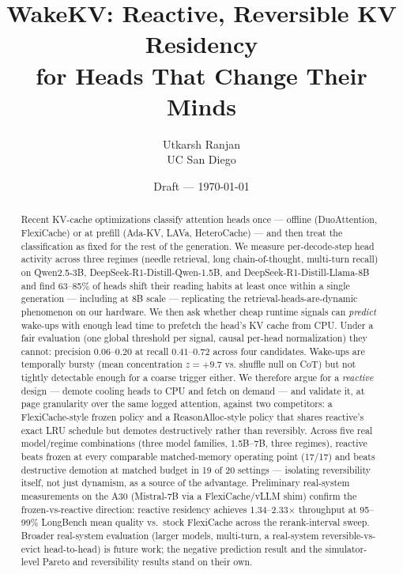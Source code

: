 \documentclass[11pt]{article}
\title{WakeKV: Reactive, Reversible KV Residency\\
       for Heads That Change Their Minds}
\author{Utkarsh Ranjan\\ UC San Diego}
\date{Draft --- \today}
\begin{document}
\maketitle

\begin{abstract}
Recent KV-cache optimizations classify attention heads once --- offline
(DuoAttention, FlexiCache) or at prefill (Ada-KV, LAVa, HeteroCache) ---
and then treat the classification as fixed for the rest of the
generation. We measure per-decode-step head activity across three
regimes (needle retrieval, long chain-of-thought, multi-turn recall) on
Qwen2.5-3B, DeepSeek-R1-Distill-Qwen-1.5B, and DeepSeek-R1-Distill-Llama-8B
and find 63--85\% of heads shift their reading habits at least once
within a single generation --- including at 8B scale --- replicating
the retrieval-heads-are-dynamic phenomenon on our hardware.
We then ask whether cheap runtime signals can \emph{predict} wake-ups
with enough lead time to prefetch the head's KV cache from CPU. Under a
fair evaluation (one global threshold per signal, causal per-head
normalization) they cannot: precision $0.06$--$0.20$ at recall
$0.41$--$0.72$ across four candidates. Wake-ups are temporally bursty
(mean concentration $z = +9.7$ vs. shuffle null on CoT) but not tightly
detectable enough for a coarse trigger either. We therefore argue for a
\emph{reactive} design --- demote cooling heads to CPU and fetch on
demand --- and validate it, at page granularity over the same logged
attention, against two competitors: a FlexiCache-style frozen policy and
a ReasonAlloc-style policy that shares reactive's exact LRU schedule but
demotes destructively rather than reversibly. Across five real
model/regime combinations (three model families, 1.5B--7B, three
regimes), reactive beats frozen at every comparable matched-memory
operating point (17/17) and beats destructive demotion at matched budget
in 19 of 20 settings --- isolating reversibility itself, not just
dynamism, as a source of the advantage. Preliminary real-system
measurements on the A30 (Mistral-7B via a FlexiCache/vLLM shim) confirm
the frozen-vs-reactive direction: reactive residency achieves
1.34--2.33$\times$ throughput at 95--99\% LongBench mean quality vs.\
stock FlexiCache across the rerank-interval sweep. Broader real-system
evaluation (larger models, multi-turn, a real-system reversible-vs-evict
head-to-head) is future work; the negative prediction result and the
simulator-level Pareto and reversibility results stand on their own.
\end{abstract}
\end{document}
